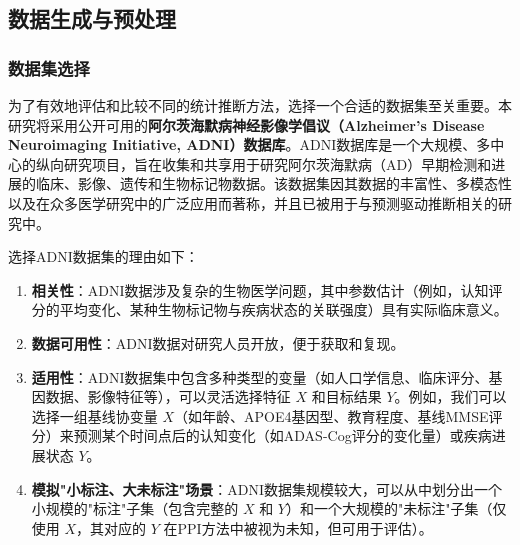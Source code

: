 \documentclass[12pt,a4paper]{article}
\begin{document}
\subsection{数据生成与预处理}
\label{sec:dataset_preprocessing}

\subsubsection{数据集选择}
\label{sec:dataset_selection}
\indent 为了有效地评估和比较不同的统计推断方法，选择一个合适的数据集至关重要。本研究将采用公开可用的\textbf{阿尔茨海默病神经影像学倡议（Alzheimer's Disease Neuroimaging Initiative, ADNI）数据库}。ADNI数据库是一个大规模、多中心的纵向研究项目，旨在收集和共享用于研究阿尔茨海默病（AD）早期检测和进展的临床、影像、遗传和生物标记物数据。该数据集因其数据的丰富性、多模态性以及在众多医学研究中的广泛应用而著称，并且已被用于与预测驱动推断相关的研究中。

选择ADNI数据集的理由如下：
\begin{enumerate}
    \item \textbf{相关性}：ADNI数据涉及复杂的生物医学问题，其中参数估计（例如，认知评分的平均变化、某种生物标记物与疾病状态的关联强度）具有实际临床意义。
    \item \textbf{数据可用性}：ADNI数据对研究人员开放，便于获取和复现。
    \item \textbf{适用性}：ADNI数据集中包含多种类型的变量（如人口学信息、临床评分、基因数据、影像特征等），可以灵活选择特征 $X$ 和目标结果 $Y$。例如，我们可以选择一组基线协变量 $X$（如年龄、APOE4基因型、教育程度、基线MMSE评分）来预测某个时间点后的认知变化（如ADAS-Cog评分的变化量）或疾病进展状态 $Y$。
    \item \textbf{模拟"小标注、大未标注"场景}：ADNI数据集规模较大，可以从中划分出一个小规模的"标注"子集（包含完整的 $X$ 和 $Y$）和一个大规模的"未标注"子集（仅使用 $X$，其对应的 $Y$ 在PPI方法中被视为未知，但可用于评估）。
\end{enumerate}
\end{document}
